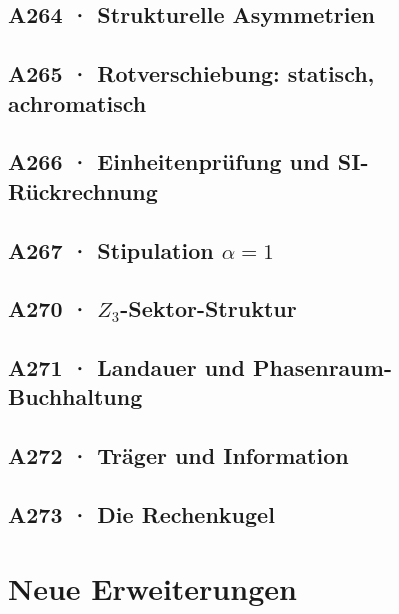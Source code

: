 \documentclass[11pt,twoside,openright]{book}
\begin{document}
\chapter[A264 · Strukturelle Asymmetrien]{A264 · Strukturelle Asymmetrien}


\chapter[A265 · Rotverschiebung]{A265 · Rotverschiebung: statisch, achromatisch}


\chapter[A266 · Einheitenprüfung]{A266 · Einheitenprüfung und SI-Rückrechnung}


\chapter[A267 · Stipulation $\alpha=1$]{A267 · Stipulation $\alpha=1$}


\chapter[A270 · $Z_3$-Sektor-Struktur]{A270 · $Z_3$-Sektor-Struktur}


\chapter[A271 · Landauer und Phasenraum]{A271 · Landauer und Phasenraum-Buchhaltung}


\chapter[A272 · Träger und Information]{A272 · Träger und Information}


\chapter[A273 · Die Rechenkugel]{A273 · Die Rechenkugel}


\part{Neue Erweiterungen}
\end{document}
